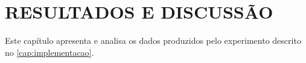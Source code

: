 \chapter{RESULTADOS E DISCUSSÃO}
\label{cap:resultados}

Este capítulo apresenta e analisa os dados produzidos pelo experimento descrito no
\autoref{cap:implementacao}.
